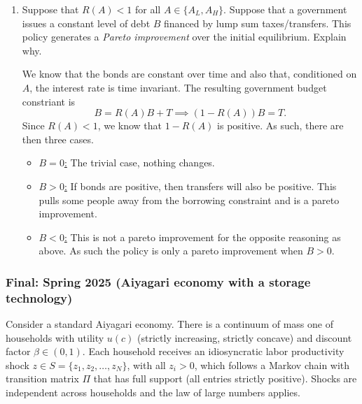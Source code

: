 \documentclass[11pt,english]{article}
\begin{document}
\begin{enumerate}
\begin{solution}
\begin{align*}
\end{align*} Since this expression is independent of time period (which confirms the conjecture), we can distribute the $A$ and $z_H$ to write  $$\boxed{R(A) = \frac{1}{\beta}\left(
                \frac{1}{
                    \displaystyle
                    \pi_A \frac{A}{A_H}
                    \!\left(\pi_z \frac{z_H}{z_H} + (1-\pi_z)\frac{z_H}{z_L}\right)
                    + (1-\pi_A) \frac{A}{A_L}
                    \!\left(\pi_z \frac{z_H}{z_H} + (1-\pi_z)\frac{z_H}{z_L}\right)
                }
            \right).}$$
    \end{solution}
 
    \item[(c)] Suppose that $R(A) < 1$ for all $A \in \{A_L, A_H\}$. Suppose
        that a government issues a constant level of debt $B$ financed by lump
        sum taxes/transfers. This policy generates a \textit{Pareto improvement}
        over the initial equilibrium. Explain why.
    \begin{solution}
We know that the bonds are constant over time and also that, conditioned on $A$, the interest rate is time invariant. The resulting government budget constriant is $$B = R(A)B + T \implies (1 - R(A))B = T.$$ Since $R(A) < 1$, we know that $1 - R(A)$ is positive. As such, there are then three cases.
\begin{itemize}
\item \underline{$B = 0$:} The trivial case, nothing changes.

\item \underline{$B > 0$:} If bonds are positive, then transfers will also be positive. This pulls some people away from the borrowing constraint and is a pareto improvement.

\item \underline{$B < 0$:} This is not a pareto improvement for the opposite reasoning as above. As such the policy is only a pareto improvement when $B> 0$.
\end{itemize}
    \end{solution}
\end{enumerate}

\subsubsection{Final: Spring 2025 (Aiyagari economy with a storage technology)}
Consider a standard Aiyagari economy. There is a continuum of mass one of
households with utility $u(c)$ (strictly increasing, strictly concave) and
discount factor $\beta \in (0,1)$. Each household receives an idiosyncratic
labor productivity shock $z \in S = \{z_1, z_2, \ldots, z_N\}$, with all
$z_i > 0$, which follows a Markov chain with transition matrix $\Pi$ that has
full support (all entries strictly positive). Shocks are independent across
households and the law of large numbers applies.
 
\end{document}
